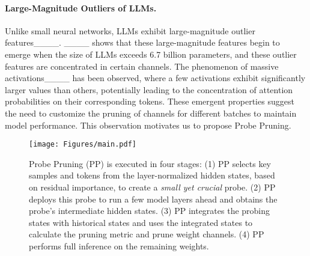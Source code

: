 \paragraph{Large-Magnitude Outliers of LLMs.} Unlike small neural networks, LLMs exhibit large-magnitude outlier features____. ____ shows that these large-magnitude features begin to emerge when the size of LLMs exceeds 6.7 billion parameters, and these outlier features are concentrated in certain channels. The phenomenon of massive activations____ has been observed, where a few activations exhibit significantly larger values than others, potentially leading to the concentration of attention probabilities on their corresponding tokens. These emergent properties suggest the need to customize the pruning of channels for different batches to maintain model performance. This observation motivates us to propose Probe Pruning.
\begin{figure*}
    \centering
    \texttt{[image: Figures/main.pdf]}
    \caption{Probe Pruning (PP) is executed in four stages: (1) PP selects key samples and tokens from the layer-normalized hidden states, based on residual importance, to create a \textit{small yet crucial} probe. (2) PP deploys this probe to run a few model layers ahead and obtains the probe's intermediate hidden states. (3) PP integrates the probing states with historical states and uses the integrated states to calculate the pruning metric and prune weight channels. (4) PP performs full inference on the remaining weights.}
    \vspace{-0.5cm}
    \label{fig:main_figure}
\end{figure*}
\vspace{-0.3cm}